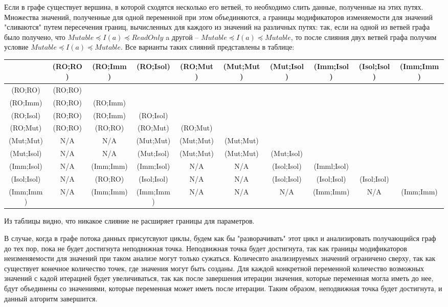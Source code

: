 Если в графе существует вершина, в которой сходятся несколько его ветвей, то необходимо слить данные, полученные на этих путях. Множества значений, полученные для одной переменной при этом объединяются, а границы модификаторов изменяемости для значений "сливаются" путем пересечения границ, вычисленных для каждого из значений на различных путях: так, если на одной из ветвей графа было получено, что $Mutable \preceq I(a) \preceq  ReadOnly$ a другой -- $Mutable \preceq I(a) \preceq  Mutable$, то после слияния двух ветвей графа получим условие $Mutable \preceq I(a) \preceq  Mutable$. Все варианты таких слияний представлены в таблице:

{\tiny

	\begin{tabular}{| c | c | c | c | c | c | c | c | c | c |}
	\hline  &(RO;RO)&(RO;Imm)&(RO;Isol)&(RO;Mut)&(Mut;Mut)&(Mut;Isol)&(Imm;Isol)&(Isol;Isol)&(Imm;Imm)\\
	\hline(RO;RO)&(RO;RO)& & & & & & & & \\
	\hline(RO;Imm)&(RO;RO)&(RO;Imm) & & & & & & & \\
	\hline(RO;Isol)&(RO;RO)&(RO;Imm)&(RO;Isol)& & & & & & \\
	\hline(RO;Mut)&(RO;RO)&(RO;RO)&(RO;Mut)&(RO;Mut) & & & & & \\
	\hline(Mut;Mut)&N/A&N/A&(Mut;Mut)&(Mut;Mut)&(Mut;Mut) & & & & \\
	\hline(Mut;Isol)&N/A&N/A&(Mut;Isol)&(Mut;Mut)&(Mut;Mut)&(Mut;Isol)& & & \\
	\hline(Imm;Isol)&N/A&(Imm;Imm)&(Imm;Isol)&N/A&N/A&(Isol;Isol)&(Imml;Isol)& & \\
	\hline(Isol;Isol)&N/A&(RO;RO)&(Isol;Isol)&N/A&N/A&(Isol;Isol)&(Isol;Isol)&(Isol;Isol)& \\
	\hline(Imm;Imm)&N/A&(Imm;Imm)&(Imm;Imm)&N/A&N/A&N/A&(Imm;Imm)&N/A&(Imm;Imm)\\    
	\hline
    \end{tabular}

}
Из таблицы видно, что никакое слияние не расширяет границы для параметров.

В случае, когда в графе потока данных присутсвуют циклы, будем как бы "разворачивать" этот цикл и анализировать получающийся граф до тех пор, пока не будет достигнута неподвижная точка. Неподвижная точка будет достигнута, так как границы модификаторов неизменяемости для значений при таком анализе могут только сужаться. Количесвто анализируемых значений ограничено сверху, так как существует конечное количество точек, где значения могут быть созданы. Для каждой конкретной переменной количество возможных значений с кадой итерацией будет увеличиваться, так как после завершения итерации значения, которые переменная могла иметь до нее, бдут объединены со значениями, которые переменная может иметь после итерации. Таким образом, неподвижная точка будет достигнута, и данный алгоритм завершится.

